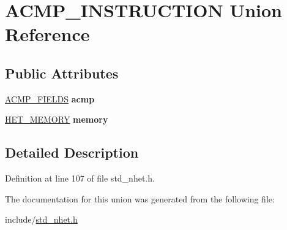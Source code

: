 \hypertarget{unionACMP__INSTRUCTION}{}\section{A\+C\+M\+P\+\_\+\+I\+N\+S\+T\+R\+U\+C\+T\+I\+ON Union Reference}
\label{unionACMP__INSTRUCTION}
\subsection*{Public Attributes}
\begin{DoxyCompactItemize}
\item 
\mbox{\label{unionACMP__INSTRUCTION_ad5b656c0bb15c42fe939f43cad8f96ad}} 
\mbox{\hyperlink{structacmp__format}{A\+C\+M\+P\+\_\+\+F\+I\+E\+L\+DS}} {\bfseries acmp}
\item 
\mbox{\label{unionACMP__INSTRUCTION_a6ca1e8cff3a1f588ac2ed643be8da9dd}} 
\mbox{\hyperlink{structmemory__format}{H\+E\+T\+\_\+\+M\+E\+M\+O\+RY}} {\bfseries memory}
\end{DoxyCompactItemize}


\subsection{Detailed Description}


Definition at line 107 of file std\+\_\+nhet.\+h.



The documentation for this union was generated from the following file\+:\begin{DoxyCompactItemize}
\item 
include/\mbox{\hyperlink{std__nhet_8h}{std\+\_\+nhet.\+h}}\end{DoxyCompactItemize}
